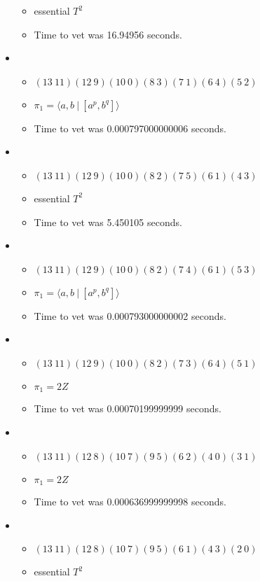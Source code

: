 \documentclass{article}
\begin{document}
\begin{itemize}
\begin{itemize}
      \item essential $T^2$
      \item Time to vet was 16.94956 seconds.
\end{itemize}
\item \begin{itemize}
      \item $(13\ 11)(12\ 9)(10\ 0)(8\ 3)(7\ 1)(6\ 4)(5\ 2)$
      \item $\pi_1 = \langle a,b\ |\ [a^p,b^q]\rangle$
      \item Time to vet was 0.000797000000006 seconds.
\end{itemize}
\item \begin{itemize}
      \item $(13\ 11)(12\ 9)(10\ 0)(8\ 2)(7\ 5)(6\ 1)(4\ 3)$
      \item essential $T^2$
      \item Time to vet was 5.450105 seconds.
\end{itemize}
\item \begin{itemize}
      \item $(13\ 11)(12\ 9)(10\ 0)(8\ 2)(7\ 4)(6\ 1)(5\ 3)$
      \item $\pi_1 = \langle a,b\ |\ [a^p,b^q]\rangle$
      \item Time to vet was 0.000793000000002 seconds.
\end{itemize}
\item \begin{itemize}
      \item $(13\ 11)(12\ 9)(10\ 0)(8\ 2)(7\ 3)(6\ 4)(5\ 1)$
      \item $\pi_1 =2 Z$
      \item Time to vet was 0.00070199999999 seconds.
\end{itemize}
\item \begin{itemize}
      \item $(13\ 11)(12\ 8)(10\ 7)(9\ 5)(6\ 2)(4\ 0)(3\ 1)$
      \item $\pi_1 =2 Z$
      \item Time to vet was 0.000636999999998 seconds.
\end{itemize}
\item \begin{itemize}
      \item $(13\ 11)(12\ 8)(10\ 7)(9\ 5)(6\ 1)(4\ 3)(2\ 0)$
      \item essential $T^2$

\end{itemize}
\end{itemize}
\end{document}
